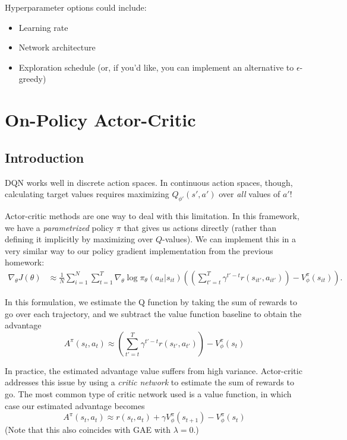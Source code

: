 \documentclass{article}
\begin{document}
Hyperparameter options could include:
\begin{itemize}
    \item Learning rate
    \item Network architecture
    \item Exploration schedule (or, if you'd like, you can implement an alternative to $\epsilon$-greedy)
\end{itemize}




\section{On-Policy Actor-Critic}
\subsection{Introduction}

DQN works well in discrete action spaces. In continuous action spaces, though, calculating target values requires maximizing $Q_{\phi'}(s', a')$ over \textit{all} values of $a'$!

Actor-critic methods are one way to deal with this limitation. In this framework, we have a \textit{parametrized} policy $\pi$ that gives us actions directly (rather than defining it implicitly by maximizing over $Q$-values). We can implement this in a very similar way to our policy gradient implementation from the previous homework:
\begin{align*}
\nabla_\theta J(\theta) &\approx \frac{1}{N} \sum_{i=1}^N \sum_{t=1}^T \nabla_\theta \log \pi_\theta(a_{it} | s_{it})\left(\left(\sum_{t'=t}^T \gamma^{t'-t} r(s_{it'}, a_{it'})\right) - V_\phi^\pi\left(s_{it}\right)\right).
\end{align*}

In this formulation, we estimate the Q function by taking the sum of rewards to go over each trajectory, and we subtract the value function baseline to obtain the advantage $$A^\pi(s_{t}, a_{t}) \approx \left(\sum_{t'=t}^T \gamma^{t'-t} r(s_{t'}, a_{t'})\right) - V_\phi^\pi\left(s_{t}\right)$$

In practice, the estimated advantage value suffers from high variance. Actor-critic addresses this issue by using a \textit{critic network} to estimate the sum of rewards to go. The most common type of critic network used is a value function, in which case our estimated advantage becomes
$$A^\pi(s_{t}, a_{t}) \approx r(s_{t}, a_{t}) + \gamma V_\phi^\pi\left(s_{t+1}\right) - V_\phi^\pi\left(s_{t}\right)$$
(Note that this also coincides with GAE with $\lambda = 0$.)
\end{document}
